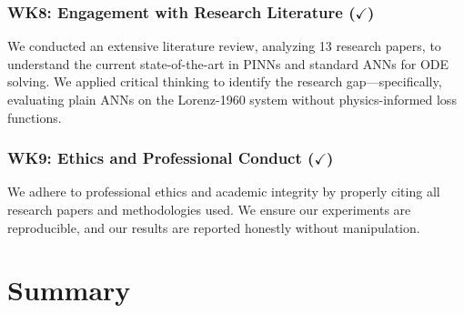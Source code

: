 \subsubsection{WK8: Engagement with Research Literature ($\checkmark$)}

We conducted an extensive literature review, analyzing 13 research papers, to understand the current state-of-the-art in PINNs and standard ANNs for ODE solving. We applied critical thinking to identify the research gap---specifically, evaluating plain ANNs on the Lorenz-1960 system without physics-informed loss functions.

\subsubsection{WK9: Ethics and Professional Conduct ($\checkmark$)}

We adhere to professional ethics and academic integrity by properly citing all research papers and methodologies used. We ensure our experiments are reproducible, and our results are reported honestly without manipulation.


\section{Summary}
